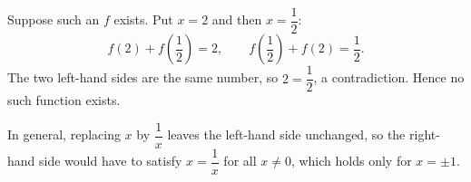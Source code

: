 Suppose such an $f$ exists. Put $x=2$ and then $x=\dfrac{1}{2}$:
\[
f(2)+f\!\left(\dfrac{1}{2}\right)=2,\qquad f\!\left(\dfrac{1}{2}\right)+f(2)=\dfrac{1}{2} .
\]
The two left-hand sides are the same number, so $2=\dfrac{1}{2}$, a contradiction. Hence no such function exists.

In general, replacing $x$ by $\dfrac{1}{x}$ leaves the left-hand side unchanged, so the right-hand side would have to satisfy $x=\dfrac{1}{x}$ for all $x\ne0$, which holds only for $x=\pm1$.

